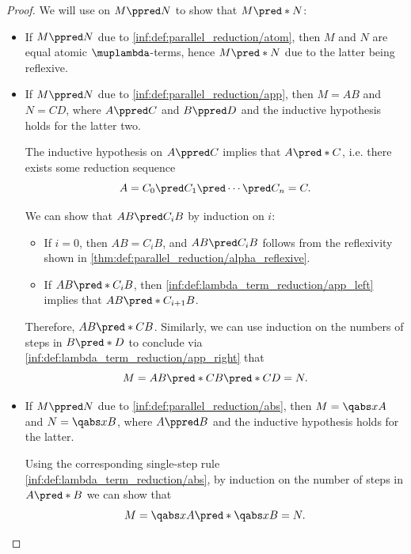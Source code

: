 \begin{proof}
   We will use  on \( M \ppred N \) to show that \( M \pred* N \):
  \begin{itemize}
    \item If \( M \ppred N \) due to \ref{inf:def:parallel_reduction/atom}, then \( M \) and \( N \) are equal atomic \( \muplambda \)-terms, hence \( M \pred* N \) due to the latter being reflexive.

    \item If \( M \ppred N \) due to \ref{inf:def:parallel_reduction/app}, then \( M = AB \) and \( N = CD \), where \( A \ppred C \) and \( B \ppred D \) and the inductive hypothesis holds for the latter two.

    The inductive hypothesis on \( A \ppred C \) implies that \( A \pred* C \), i.e. there exists some reduction sequence
    \begin{equation*}
      A = C_0 \pred C_1 \pred \cdots \pred C_n = C.
    \end{equation*}

    We can show that \( AB \pred C_i B \) by induction on \( i \):
    \begin{itemize}
      \item If \( i = 0 \), then \( AB = C_i B \), and \( AB \pred C_i B \) follows from the reflexivity shown in \cref{thm:def:parallel_reduction/alpha_reflexive}.

      \item If \( AB \pred* C_i B \), then \ref{inf:def:lambda_term_reduction/app_left} implies that \( AB \pred* C_{i+1} B \).
    \end{itemize}

    Therefore, \( AB \pred* CB \). Similarly, we can use induction on the numbers of steps in \( B \pred* D \) to conclude via \ref{inf:def:lambda_term_reduction/app_right} that
    \begin{equation*}
      M = AB \pred* CB \pred* CD = N.
    \end{equation*}

    \item If \( M \ppred N \) due to \ref{inf:def:parallel_reduction/abs}, then \( M = \qabs x A \) and \( N = \qabs x B \), where \( A \ppred B \) and the inductive hypothesis holds for the latter.

    Using the corresponding single-step rule \ref{inf:def:lambda_term_reduction/abs}, by induction on the number of steps in \( A \pred* B \) we can show that
    \begin{equation*}
      M = \qabs x A \pred* \qabs x B = N.
    \end{equation*}


\end{itemize}
\end{proof}
